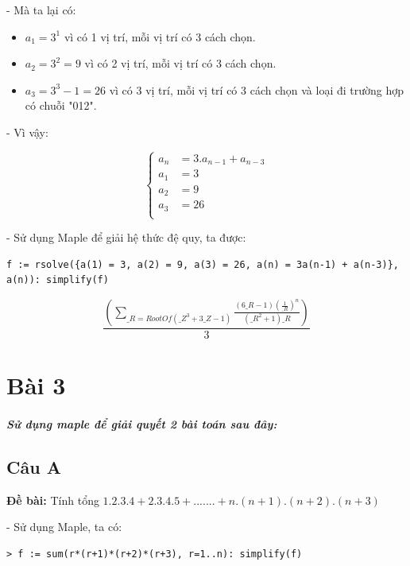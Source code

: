 \documentclass[12pt]{article}
\begin{document}
\begin{sloppypar}
- Mà ta lại có:

\begin{itemize}
    \item \(a_{1} = 3^{1}\) vì có 1 vị trí, mỗi vị trí có 3 cách chọn.
    \item \(a_{2} = 3^{2} = 9\) vì có 2 vị trí, mỗi vị trí có 3 cách chọn.
    \item \(a_{3} = 3^{3} - 1 = 26\) vì có 3 vị trí, mỗi vị trí có 3 cách chọn và loại đi trường hợp có chuỗi "012".
\end{itemize}

- Vì vậy:

\[
    \begin{cases}
        a_{n} & = 3.a_{n-1} + a_{n-3}\\             
        a_{1} & = 3 \\
        a_{2} & = 9 \\
        a_{3} & = 26 \\
    \end{cases} 
    \]


- Sử dụng Maple để giải hệ thức đệ quy, ta được:


\begin{lstlisting}[breaklines]
    f := rsolve({a(1) = 3, a(2) = 9, a(3) = 26, a(n) = 3a(n-1) + a(n-3)}, a(n)): simplify(f)
\end{lstlisting}

\begin{equation*}
    \frac{\left(\sum_{\_R = RootOf(\_Z^{3} + 3\_Z - 1)}\frac{(6\_R - 1)(\frac{1}{\_R})^{n}}{(\_R^{2} + 1)\_R}\right)}{3}
\end{equation*}

\section{Bài 3}
\subparagraph {Sử dụng maple để giải quyết 2 bài toán sau đây:}

\subsection{Câu A}
\begin{tcolorbox}
    \textbf{Đề bài:} Tính tổng \(1.2.3.4 + 2.3.4.5 + ....... + n.(n+1).(n+2).(n+3)\)
\end{tcolorbox}

- Sử dụng Maple, ta có:

\begin{verbatim}
> f := sum(r*(r+1)*(r+2)*(r+3), r=1..n): simplify(f)
\end{verbatim}


\end{sloppypar}
\end{document}

